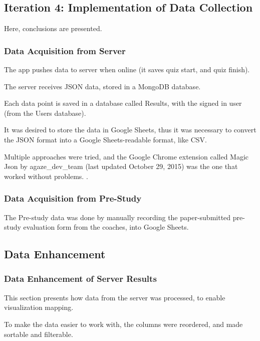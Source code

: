 \subsection{Iteration 4: Implementation of Data Collection}

Here, conclusions are presented.

\subsubsection{Data Acquisition from Server}

The app pushes data to server when online (it saves quiz start, and quiz finish).

The server receives JSON data, stored in a MongoDB database.

Each data point is saved in a database called Results, with the signed in user (from the Users database).

It was desired to store the data in Google Sheets, thus it was necessary to convert the JSON format into a Google Sheets-readable format, like CSV.

Multiple approaches were tried, and the Google Chrome extension called Magic Json by agaze\_dev\_team (last updated October 29, 2015) %
was the one that worked without problems. \cite{agaze}.

\subsubsection{Data Acquisition from Pre-Study}

The Pre-study data was done by manually recording the paper-submitted pre-study evaluation form from the coaches, into Google Sheets.

\subsection{Data Enhancement}

\subsubsection{Data Enhancement of Server Results}

This section presents how data from the server was processed, to enable visualization mapping.

To make the data easier to work with, the columns were reordered, and made sortable and filterable.

